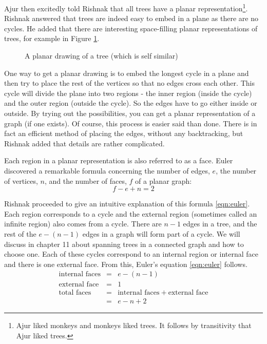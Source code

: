  Ajur then excitedly told Rishnak that all trees have a planar representation\footnote{Ajur liked monkeys and monkeys liked trees. It follows by transitivity that Ajur liked trees.}. Rishnak answered that trees are indeed easy to embed in a plane as there are
 no cycles. He added that there are interesting space-filling planar representations of trees, for example in Figure \ref{9g7}.
\begin{figure}
\begin{center}    

  \caption{ A planar drawing of a tree (which is self similar)}\label{9g7}
  \end{center}
\end{figure}

One way to get a planar drawing is to embed the longest cycle in a plane and then try to place the rest of the vertices so that no edges cross each other. This cycle will divide the plane into two regions - the inner region (inside the cycle) and the outer region (outside the cycle). So the edges have to go either inside or outside. By trying out the possibilities, you can get a planar representation of a graph (if one exists). Of course, this process is easier said than done. There is in fact an efficient method of placing the edges, without any backtracking, but Rishnak added that details are rather complicated. 

Each region in a planar representation is also referred to as a face. Euler discovered a remarkable formula concerning the number of edges, $e$, the number of vertices, $n$, and the number of faces, $f$ of a planar graph:
\begin{equation}
\label{eqn:euler}
  f-e+n=2 
\end{equation}

 

Rishnak proceeded to give an intuitive explanation of this formula \ref{eqn:euler}. Each region corresponds to a cycle and the external region (sometimes called an infinite region) also comes from a cycle. 
There are $n-1$ edges in a tree, and the rest of the $e-(n-1)$ edges in a graph will form part of a cycle. We will discuss in chapter 11 about spanning trees in a connected graph and how to choose one.
Each of these cycles correspond to an internal region or internal face and there is one external face. From this, Euler's equation \ref{eqn:euler} follows.
\begin{eqnarray}
    \label{eqn:cycles}
    \text{internal faces}&=&e-(n-1)\nonumber\\
    \text{external face}&=&1 \nonumber \\
    \text{total faces}&=& \text{internal faces}~+~\text{external face} \nonumber \\
    &=&e-n+2
\end{eqnarray}

